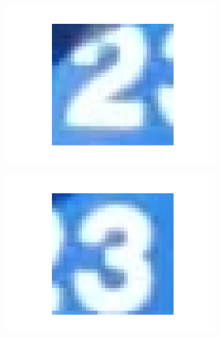 \documentclass[14pt,a4paper]{extarticle}
\begin{document}
\begin{figure}[htb]
\begin{subfigure}[b]{0.3\textwidth}
    \includegraphics[width=\textwidth]{../res/svhn/sample_2.png}
    \label{fig:svhn_sample_2}
  \end{subfigure}
  \hfill
  \begin{subfigure}[b]{0.3\textwidth}
    \includegraphics[width=\textwidth]{../res/svhn/sample_3.png}
    \label{fig:svhn_sample_3}
  \end{subfigure}
  \hfill
  \begin{subfigure}[b]{0.3\textwidth}

\end{subfigure}
\end{figure}
\end{document}
